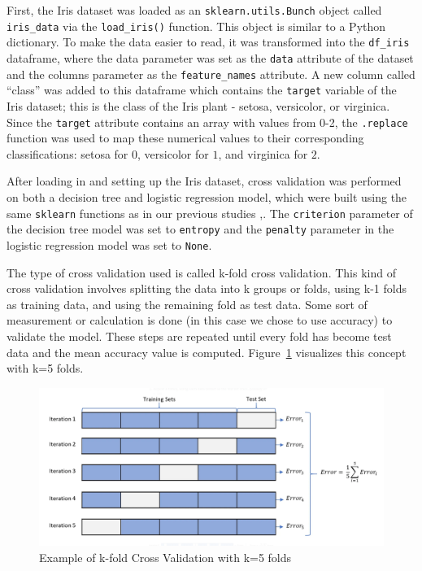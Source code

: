 \documentclass[journal]{IEEEtran}
\begin{document}
First, the Iris dataset was loaded as an \lstinline{sklearn.utils.Bunch} object called \lstinline{iris_data} via the \lstinline{load_iris()} function. This object is similar to a Python dictionary. To make the data easier to read, it was transformed into the \lstinline{df_iris} dataframe, where the data parameter was set as the \lstinline{data} attribute of the dataset and the columns parameter as the \lstinline{feature_names} attribute. A new column called “class” was added to this dataframe which contains the \lstinline{target} variable of the Iris dataset; this is the class of the Iris plant - setosa, versicolor, or virginica. Since the \lstinline{target} attribute contains an array with values from 0-2, the \lstinline{.replace} function was used to map these numerical values to their corresponding classifications: setosa for \(0\), versicolor for \(1\), and virginica for \(2\). 

After loading in and setting up the Iris dataset, cross validation was performed on both a decision tree and logistic regression model, which were built using the same \lstinline{sklearn} functions as in our previous studies \cite{b2},\cite{b3}. The \lstinline{criterion} parameter of the decision tree model was set to \lstinline{entropy} and the \lstinline{penalty} parameter in the logistic regression model was set to \lstinline{None}.

The type of cross validation used is called k-fold cross validation. This kind of cross validation involves splitting the data into k groups or folds, using k-1 folds as training data, and using the remaining fold as test data. Some sort of measurement or calculation is done (in this case we chose to use accuracy) to validate the model. These steps are repeated until every fold has become test data and the mean accuracy value is computed. Figure~\ref{fig:kfoldCV} visualizes this concept with k=5 folds.

\begin{figure}[h!]
\includegraphics[scale=0.18]{5foldCV.png}
\centering
\caption{Example of k-fold Cross Validation with k=5 folds \cite{b4}}
\label{fig:kfoldCV}
\end{figure}
\end{document}

